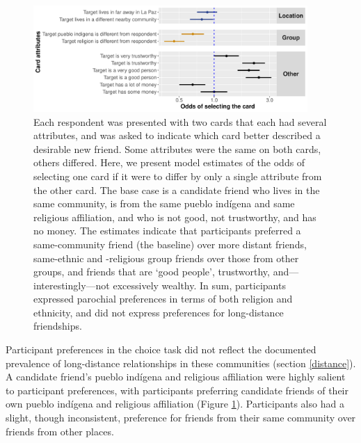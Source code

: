 \documentclass[bibauthoryear]{aa}
\begin{document}
 \begin{figure}[t]
 \centering
\includegraphics[width=4.10in]{Bolivia_CardChoice_Non-Standardized_CR} %
\caption{{\footnotesize Each respondent was presented with two cards that each had several attributes, and was asked to indicate which card better described a desirable new friend. Some attributes were the same on both cards, others differed. Here, we present model estimates of the odds of selecting one card if it were to differ by only a single attribute from the other card. The base case is a candidate friend who lives in the same community, is from the same pueblo ind\'igena and same religious affiliation, and who is not good, not trustworthy, and has no money. The estimates indicate that participants preferred a same-community friend (the baseline) over more distant friends, same-ethnic and -religious group friends over those from other groups, and friends that are `good people', trustworthy, and---interestingly---not excessively wealthy. In sum, participants expressed parochial preferences in terms of both religion and ethnicity, and did not express preferences for long-distance friendships.
}
} \label{boliviacards}
\end{figure}



	Participant preferences in the choice task did not reflect the documented prevalence of long-distance relationships in these communities (section \ref{distance}). A candidate friend's pueblo ind\'igena and religious affiliation were highly salient to participant preferences, with participants preferring candidate friends of their own pueblo ind\'igena and religious affiliation (Figure \ref{boliviacards}). Participants also had a slight, though inconsistent, preference for friends from their same community over friends from other places. 
	
\end{document}
